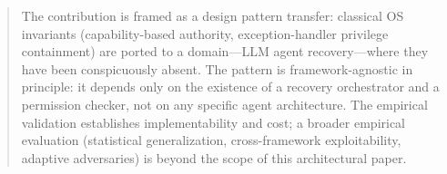 \begin{abstract}
The contribution is framed as a design pattern transfer: classical OS invariants (capability-based authority, exception-handler privilege containment) are ported to a domain---LLM agent recovery---where they have been conspicuously absent. The pattern is framework-agnostic in principle: it depends only on the existence of a recovery orchestrator and a permission checker, not on any specific agent architecture. The empirical validation establishes implementability and cost; a broader empirical evaluation (statistical generalization, cross-framework exploitability, adaptive adversaries) is beyond the scope of this architectural paper.
\end{abstract}
